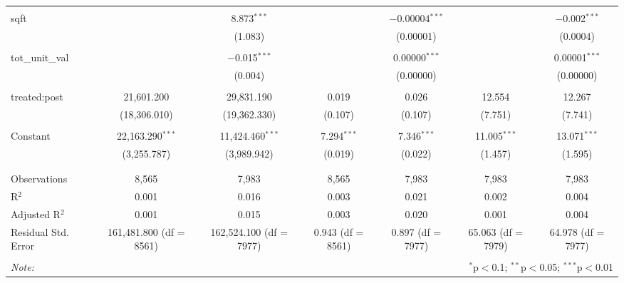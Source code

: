 \begin{table}[H]
{\begin{tabular}{@{\extracolsep{5pt}}lcccccc}
   & & & & & & \\  

  sqft &  & 8.873$^{***}$ &  & $-$0.00004$^{***}$ &  & $-$0.002$^{***}$ \\  

   &  & (1.083) &  & (0.00001) &  & (0.0004) \\  

   & & & & & & \\  

  tot\_unit\_val &  & $-$0.015$^{***}$ &  & 0.00000$^{***}$ &  & 0.00001$^{***}$ \\  

   &  & (0.004) &  & (0.00000) &  & (0.00000) \\  

   & & & & & & \\  

  treated:post & 21,601.200 & 29,831.190 & 0.019 & 0.026 & 12.554 & 12.267 \\  

   & (18,306.010) & (19,362.330) & (0.107) & (0.107) & (7.751) & (7.741) \\  

   & & & & & & \\  

  Constant & 22,163.290$^{***}$ & 11,424.460$^{***}$ & 7.294$^{***}$ & 7.346$^{***}$ & 11.005$^{***}$ & 13.071$^{***}$ \\  

   & (3,255.787) & (3,989.942) & (0.019) & (0.022) & (1.457) & (1.595) \\  

   & & & & & & \\  

 \hline \\[-1.8ex]  

 Observations & 8,565 & 7,983 & 8,565 & 7,983 & 7,983 & 7,983 \\  

 R$^{2}$ & 0.001 & 0.016 & 0.003 & 0.021 & 0.002 & 0.004 \\  

 Adjusted R$^{2}$ & 0.001 & 0.015 & 0.003 & 0.020 & 0.001 & 0.004 \\  

 Residual Std. Error & 161,481.800 (df = 8561) & 162,524.100 (df = 7977) & 0.943 (df = 8561) & 0.897 (df = 7977) & 65.063 (df = 7979) & 64.978 (df = 7977) \\  

 \hline  

 \hline \\[-1.8ex]  

 \textit{Note:}  & \multicolumn{6}{r}{$^{*}$p$<$0.1; $^{**}$p$<$0.05; $^{***}$p$<$0.01} \\  

 \end{tabular}}  

 \end{table}  

